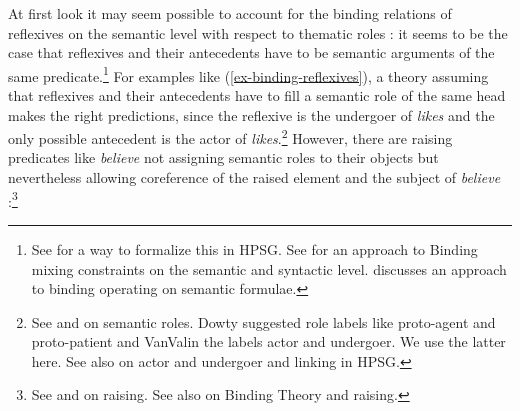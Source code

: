 \documentclass[output=paper,biblatex,babelshorthands,newtxmath,draftmode,colorlinks,citecolor=brown]{langscibook}
\begin{document}
At first look it may seem possible to account for the binding relations of reflexives on the
semantic level with respect to thematic roles \parencites[Section~4.10]{Jackendoff72a-u}{Wilkins1988a-u}[Chapter~6]{Williams1994a-u}:
it seems to be the case that reflexives and their antecedents have to be semantic
arguments of the same predicate.\footnote{%
  See \citet{Riezler95a} for a way to formalize this in HPSG. See  for an approach to
  Binding mixing constraints on the semantic and syntactic level.
 discusses an approach to binding operating on
semantic formulae.%
} For examples like (\ref{ex-binding-reflexives}), a theory assuming that reflexives and their antecedents have to
fill a semantic role of the same head makes the right predictions,
since the reflexive is the undergoer of \emph{likes} and the only possible antecedent is the actor of
\emph{likes}.\footnote{
  See  and  on semantic roles. Dowty suggested role labels like
  proto-agent and proto-patient and VanValin the labels actor and undergoer. We use the latter
  here. See also  on
  actor and undergoer and linking in HPSG.
} However, there are raising predicates like \emph{believe} not assigning semantic roles
to their objects but nevertheless allowing coreference of the raised element and the subject of
\emph{believe} \citep[]{MS98a}:\footnote{%
 See  and  on raising. See also  on Binding
 Theory and raising.%
}
\end{document}
